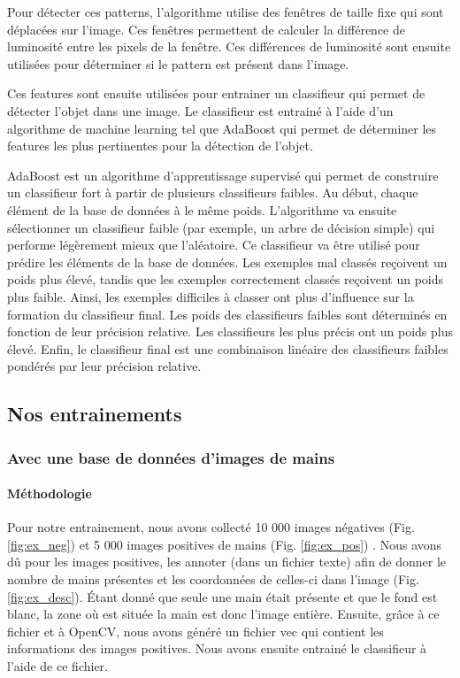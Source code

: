 \documentclass[11pt]{article}
\begin{document}
\bigbreak

Pour détecter ces patterns, l'algorithme utilise des fenêtres de taille fixe qui sont déplacées sur l'image. Ces fenêtres permettent de calculer la différence de luminosité entre les pixels de la fenêtre. Ces différences de luminosité sont ensuite utilisées pour déterminer si le pattern est présent dans l'image. 

\bigbreak

Ces features sont ensuite utilisées pour entrainer un classifieur qui permet de détecter l'objet dans une image. Le classifieur est entrainé à l'aide d'un algorithme de machine learning tel que AdaBoost \cite{adaboost} qui permet de déterminer les features les plus pertinentes pour la détection de l'objet. \bigbreak

AdaBoost est un algorithme d'apprentissage supervisé qui permet de construire un classifieur fort à partir de plusieurs classifieurs faibles.
Au début, chaque élément de la base de données à le même poids. L'algorithme va ensuite sélectionner un classifieur faible (par exemple, un arbre de décision simple) qui performe légèrement mieux que l'aléatoire. Ce classifieur va être utilisé pour prédire les éléments de la base de données. Les exemples mal classés reçoivent un poids plus élevé, tandis que les exemples correctement classés reçoivent un poids plus faible. Ainsi, les exemples difficiles à classer ont plus d'influence sur la formation du classifieur final. Les poids des classifieurs faibles sont déterminés en fonction de leur précision relative. Les classifieurs les plus précis ont un poids plus élevé. Enfin, le classifieur final est une combinaison linéaire des classifieurs faibles pondérés par leur précision relative.

\subsection{Nos entrainements}
\subsubsection{Avec une base de données d'images de mains}
\paragraph{Méthodologie}
Pour notre entrainement, nous avons collecté 10 000 images négatives (Fig. \ref{fig:ex_neg}) \cite{negatives, bdd_animal} et 5 000 images positives de mains (Fig. \ref{fig:ex_pos}) \cite{afifi201911kHands}. Nous avons dû pour les images positives, les annoter (dans un fichier texte) afin de donner le nombre de mains présentes et les coordonnées de celles-ci dans l'image (Fig. \ref{fig:ex_desc}). \'Etant donné que seule une main était présente et que le fond est blanc, la zone où est située la main est donc l'image entière. Ensuite, grâce à ce fichier et à OpenCV, nous avons généré un fichier vec qui contient les informations des images positives. Nous avons ensuite entrainé le classifieur à l'aide de ce fichier.
\bigbreak
\end{document}
